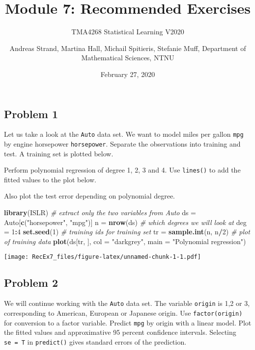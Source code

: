 \documentclass[]{article}
\title{Module 7: Recommended Exercises}
\subtitle{TMA4268 Statistical Learning V2020}
\author{Andreas Strand, Martina Hall, Michail Spitieris, Stefanie Muff,
Department of Mathematical Sciences, NTNU}
\date{February 27, 2020}
\newenvironment{Shaded}{\begin{snugshade}}{\end{snugshade}}
\newcommand{\KeywordTok}[1]{\textcolor[rgb]{0.13,0.29,0.53}{\textbf{#1}}}
\newcommand{\DataTypeTok}[1]{\textcolor[rgb]{0.13,0.29,0.53}{#1}}
\newcommand{\DecValTok}[1]{\textcolor[rgb]{0.00,0.00,0.81}{#1}}
\newcommand{\StringTok}[1]{\textcolor[rgb]{0.31,0.60,0.02}{#1}}
\newcommand{\CommentTok}[1]{\textcolor[rgb]{0.56,0.35,0.01}{\textit{#1}}}
\newcommand{\OperatorTok}[1]{\textcolor[rgb]{0.81,0.36,0.00}{\textbf{#1}}}
\newcommand{\NormalTok}[1]{#1}
\begin{document}
\maketitle

\subsection{Problem 1}\label{problem-1}

Let us take a look at the \texttt{Auto} data set. We want to model miles
per gallon \texttt{mpg} by engine horsepower \texttt{horsepower}.
Separate the observations into training and test. A training set is
plotted below.

Perform polynomial regression of degree 1, 2, 3 and 4. Use
\texttt{lines()} to add the fitted values to the plot below.

Also plot the test error depending on polynomial degree.

\begin{Shaded}
\begin{Highlighting}[]
\KeywordTok{library}\NormalTok{(ISLR)}
\CommentTok{# extract only the two variables from Auto}
\NormalTok{ds =}\StringTok{ }\NormalTok{Auto[}\KeywordTok{c}\NormalTok{(}\StringTok{"horsepower"}\NormalTok{, }\StringTok{"mpg"}\NormalTok{)]}
\NormalTok{n =}\StringTok{ }\KeywordTok{nrow}\NormalTok{(ds)}
\CommentTok{# which degrees we will look at}
\NormalTok{deg =}\StringTok{ }\DecValTok{1}\OperatorTok{:}\DecValTok{4}
\KeywordTok{set.seed}\NormalTok{(}\DecValTok{1}\NormalTok{)}
\CommentTok{# training ids for training set}
\NormalTok{tr =}\StringTok{ }\KeywordTok{sample.int}\NormalTok{(n, n}\OperatorTok{/}\DecValTok{2}\NormalTok{)}
\CommentTok{# plot of training data}
\KeywordTok{plot}\NormalTok{(ds[tr, ], }\DataTypeTok{col =} \StringTok{"darkgrey"}\NormalTok{, }\DataTypeTok{main =} \StringTok{"Polynomial regression"}\NormalTok{)}
\end{Highlighting}
\end{Shaded}

\texttt{[image: RecEx7\_files/figure-latex/unnamed-chunk-1-1.pdf]}

\subsection{Problem 2}\label{problem-2}

We will continue working with the \texttt{Auto} data set. The variable
\texttt{origin} is 1,2 or 3, corresponding to American, European or
Japanese origin. Use \texttt{factor(origin)} for conversion to a factor
variable. Predict \texttt{mpg} by origin with a linear model. Plot the
fitted values and approximative 95 percent confidence intervals.
Selecting \texttt{se\ =\ T} in \texttt{predict()} gives standard errors
of the prediction.
\end{document}
